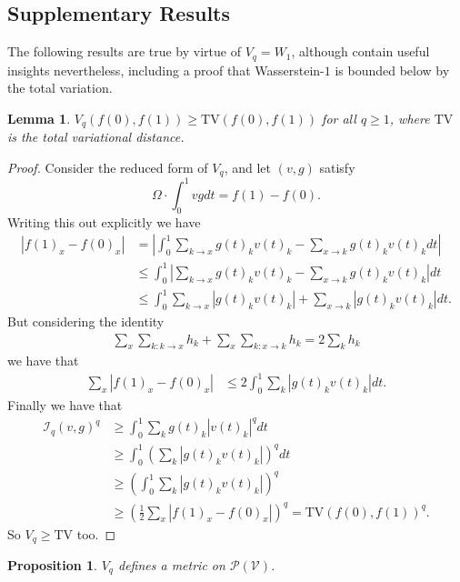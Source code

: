 \documentclass[conference]{IEEEtran}
\newcommand{\VV}{\mathcal{V}}
\theoremstyle{ieeestyle}
\newtheorem{lem}{Lemma}
\newtheorem{prop}{Proposition}
\begin{document}
\subsection{Supplementary Results}\label{appendix: supp}
The following results are true by virtue of $V_q = W_1$, although contain useful insights nevertheless, including a proof that Wasserstein-$1$ is bounded below by the total variation.
\begin{lem} $V_q(f(0),f(1)) \geq \text{TV}(f(0),f(1))$ for all $q \geq 1$, where $\text{TV}$ is the total variational distance.
\end{lem}
\begin{proof}
   Consider the reduced form of $V_q$, and let $(v,g)$ satisfy
   \begin{equation*}
       \Omega \cdot \int_0^1 vg dt = f(1) - f(0).
   \end{equation*}
   Writing this out explicitly we have
   \begin{align*}
       |f(1)_x - f(0)_x| &= \left|\int_0^1 \sum_{k \rightarrow x} g(t)_kv(t)_k - \sum_{x \rightarrow k}g(t)_kv(t)_k dt \right| \\
       &\leq \int_0^1 \left|\sum_{k \rightarrow x}g(t)_kv(t)_k - \sum_{ x \rightarrow k}g(t)_k v(t)_k \right| dt \\
       &\leq \int_0^1 \sum_{k \rightarrow x}|g(t)_kv(t)_k| + \sum_{x \rightarrow k} |g(t)_kv(t)_k| dt.
   \end{align*}
   But considering the identity
   \begin{align*}
       \sum_x \sum_{k:k \rightarrow x}h_k + \sum_x \sum_{k:x \rightarrow k} h_k = 2\sum_k h_k
   \end{align*}
   we have that 
   \begin{align*}
       \sum_x |f(1)_x - f(0)_x| &\leq 2\int_0^1 \sum_k |g(t)_k v(t)_k| dt.
   \end{align*}
   Finally we have that 
   \begin{align*}
       \mathcal{I}_q(v,g)^q &\geq \int_0^1 \sum_k g(t)_k |v(t)_k|^q dt \\
       &\geq \int_0^1 \left(\sum_k |g(t)_kv(t)_k| \right)^q dt\\
       &\geq \left( \int_0^1 \sum_k |g(t)_kv(t)_k| \right)^q \\
       &\geq \left(\frac{1}{2}\sum_x |f(1)_x - f(0)_x| \right)^q = \text{TV}(f(0),f(1))^q.
   \end{align*}
   So $V_q \geq \text{TV}$ too. 
\end{proof}
\begin{prop}$V_q$ defines a metric on $\mathcal{P}(\VV)$.
\end{prop}
\end{document}
